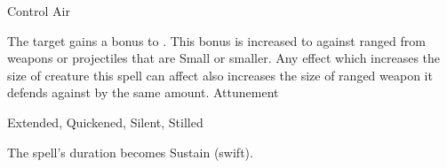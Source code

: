 \begin{spellsection}{Control Air}
\begin{spellheader}
\end{spellheader}
\begin{spellcontent}
\begin{spelltargetinginfo}
\end{spelltargetinginfo}
\begin{spelleffects}
\spelleffect
The target gains a  bonus to .
This bonus is increased to  against ranged  from weapons or projectiles that are Small or smaller.
Any effect which increases the size of creature this spell can affect also increases the size of ranged weapon it defends against by the same amount.
\spelldur Attunement
\end{spelleffects}
\end{spellcontent}
\begin{spellfooter}
 Extended, Quickened, Silent, Stilled
\end{spellfooter}
\begin{spellsubcontent}
\begin{spellcantrip}
The spell's duration becomes Sustain (swift).
\end{spellcantrip}
\end{spellsubcontent}
\end{spellsection}
